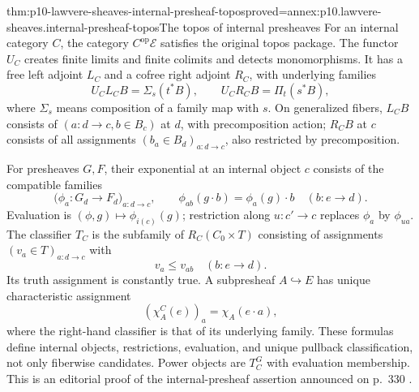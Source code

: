 \begin{hbtheorem}{thm:p10-lawvere-sheaves-internal-presheaf-topos}{proved=annex:p10.lawvere-sheaves.internal-presheaf-topos}{The topos of internal presheaves}
For an internal category \(C\), the category
\(C^{\mathrm{op}}\mathcal E\) satisfies the original topos
package.  The functor \(U_C\) creates finite limits and finite
colimits and detects monomorphisms.  It has a free left adjoint
\(L_C\) and a cofree right adjoint \(R_C\), with underlying
families
\[
             U_CL_CB=\Sigma_s(t^*B),\qquad
             U_CR_CB=\Pi_t(s^*B),
\]
where \(\Sigma_s\) means composition of a family map with
\(s\).  On generalized fibers, \(L_CB\) consists of
\((a:d\to c,b\in B_c)\) at \(d\), with precomposition
action; \(R_CB\) at \(c\) consists of all assignments
\((b_a\in B_d)_{a:d\to c}\), also restricted by
precomposition.

For presheaves \(G,F\), their exponential at an internal object
\(c\) consists of the compatible families
\[
 \bigl(\phi_a:G_d\to F_d\bigr)_{a:d\to c},
 \qquad
 \phi_{a b}(g\cdot b)=\phi_a(g)\cdot b
       \quad(b:e\to d).
\]
Evaluation is \((\phi,g)\mapsto\phi_{i(c)}(g)\);
restriction along \(u:c'\to c\) replaces \(\phi_a\)
by \(\phi_{u a}\).
The classifier \(T_C\) is the subfamily of
\(R_C(C_0\times T)\) consisting of assignments
\((v_a\in T)_{a:d\to c}\) with
\[
                         v_a\leq v_{a b}
                              \quad(b:e\to d).
\]
Its truth assignment is constantly true.  A subpresheaf
\(A\hookrightarrow E\) has unique characteristic assignment
\[
                    (\chi_A^C(e))_a=\chi_A(e\cdot a),
\]
where the right-hand classifier is that of its underlying family.
These formulas define internal objects, restrictions, evaluation,
and unique pullback classification, not only fiberwise candidates.
Power objects are \(T_C^G\) with evaluation membership.
This is an editorial proof of the internal-presheaf assertion
announced on p.~330 \cite[p.~330]{Lawvere1970}.
\end{hbtheorem}

